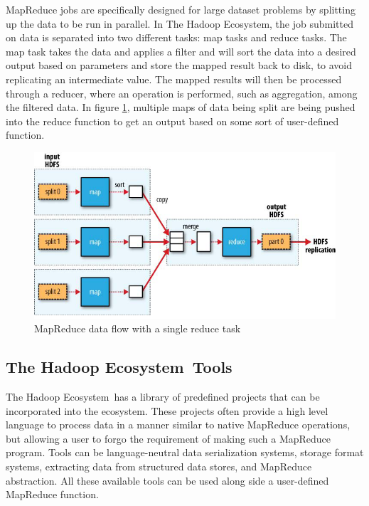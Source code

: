 \documentclass[titlepage,twocolumn]{article}
\newcommand{\HadoopEcosystem}{Hadoop Ecosystem}
\begin{document}
MapReduce jobs are specifically designed for large dataset problems by splitting up the data to be run in parallel. In The \HadoopEcosystem, the job submitted on data is separated into two different tasks: map tasks and reduce tasks. The map task takes the data and applies a filter and will sort the data into a desired output based on parameters and store the mapped result back to disk, to avoid replicating an intermediate value. The mapped results will then be processed through a reducer, where an operation is performed, such as aggregation, among the filtered data. In figure \ref{fig:mapReduceDiagram}, multiple maps of data being split are being pushed into the reduce function to get an output based on some sort of user-defined function. 

\begin{figure}[H]
	\centering
	\includegraphics[scale=.35]{mapReduceDiagram.png}
	\caption{\small MapReduce data flow with a single reduce task \cite{fei_2011}}
	\label{fig:mapReduceDiagram}
\end{figure}

\subsection{The \HadoopEcosystem\ Tools}

The \HadoopEcosystem\ has a library of predefined projects that can be incorporated into the ecosystem. These projects often provide a high level language to process data in a manner similar to native MapReduce operations, but allowing a user to forgo the requirement of making such a MapReduce program. Tools can be language-neutral data serialization systems, storage format systems, extracting data from structured data stores, and MapReduce abstraction. All these available tools can be used along side a user-defined  MapReduce function.  
\end{document}
